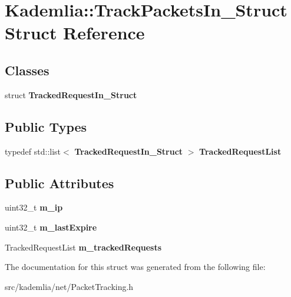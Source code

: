 \section{Kademlia::TrackPacketsIn\_\-Struct Struct Reference}
\label{structKademlia_1_1TrackPacketsIn__Struct}
\subsection*{Classes}
\begin{DoxyCompactItemize}
\item 
struct {\bf TrackedRequestIn\_\-Struct}
\end{DoxyCompactItemize}
\subsection*{Public Types}
\begin{DoxyCompactItemize}
\item 
typedef std::list$<$ {\bf TrackedRequestIn\_\-Struct} $>$ {\bfseries TrackedRequestList}\label{structKademlia_1_1TrackPacketsIn__Struct_a222c86a1067b3bfbf0f6fdb05f83630e}

\end{DoxyCompactItemize}
\subsection*{Public Attributes}
\begin{DoxyCompactItemize}
\item 
uint32\_\-t {\bfseries m\_\-ip}\label{structKademlia_1_1TrackPacketsIn__Struct_a27b236c90eca9ccb8006e43b777cb2cf}

\item 
uint32\_\-t {\bfseries m\_\-lastExpire}\label{structKademlia_1_1TrackPacketsIn__Struct_addfd1ad5416b8a49557f8425dde130c3}

\item 
TrackedRequestList {\bfseries m\_\-trackedRequests}\label{structKademlia_1_1TrackPacketsIn__Struct_a2d5b603313a8292ad37dc6c83ca70980}

\end{DoxyCompactItemize}


The documentation for this struct was generated from the following file:\begin{DoxyCompactItemize}
\item 
src/kademlia/net/PacketTracking.h\end{DoxyCompactItemize}
